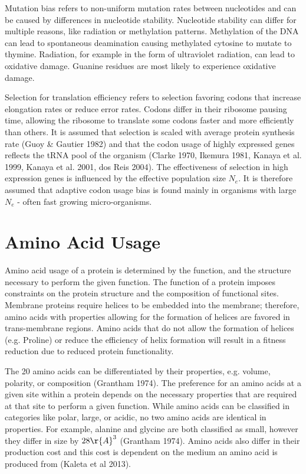 Mutation bias refers to non-uniform mutation rates between nucleotides and can be caused by differences in nucleotide stability.
Nucleotide stability can differ for multiple reasons, like radiation or methylation patterns.
Methylation of the DNA can lead to spontaneous deamination causing methylated cytosine to mutate to thymine.
Radiation, for example in the form of ultraviolet radiation, can lead to oxidative damage.
Guanine residues are most likely to experience oxidative damage.

Selection for translation efficiency refers to selection favoring codons that increase elongation rates or reduce error rates.
Codons differ in their ribosome pausing time, allowing the ribosome to translate some codons faster and more efficiently than others.
It is assumed that selection is scaled with average protein synthesis rate (Guoy \& Gautier 1982) and that the codon usage of highly expressed genes reflects the tRNA pool of the organism (Clarke 1970, Ikemura 1981, Kanaya et al. 1999, Kanaya et al. 2001, dos Reis 2004). 
The effectiveness of selection in high expression genes is influenced by the effective population size $N_e$. 
It is therefore assumed that adaptive codon usage bias is found mainly in organisms with large $N_e$ - often fast growing micro-organisms.

\section{Amino Acid Usage}
Amino acid usage of a protein is determined by the function, and the structure necessary to perform the given function.
The function of a protein imposes constraints on the protein structure and the composition of functional sites.
Membrane proteins require helices to be embedded into the membrane; therefore, amino acids with properties allowing for the formation of helices are favored in trans-membrane regions.
Amino acids that do not allow the formation of helices (e.g. Proline) or reduce the efficiency of helix formation will result in a fitness reduction due to reduced protein functionality. 

The 20 amino acids can be differentiated by their properties, e.g. volume, polarity, or composition (Grantham 1974). 
The preference for an amino acids at a given site within a protein depends on the necessary properties that are required at that site to perform a given function.
While amino acids can be classified in categories like polar, large, or acidic, no two amino acids are identical in properties.
For example, alanine and glycine are both classified as small, however they differ in size by $28 \r{A}^3$ (Grantham 1974).
Amino acids also differ in their production cost and this cost is dependent on the medium an amino acid is produced from (Kaleta et al 2013).

